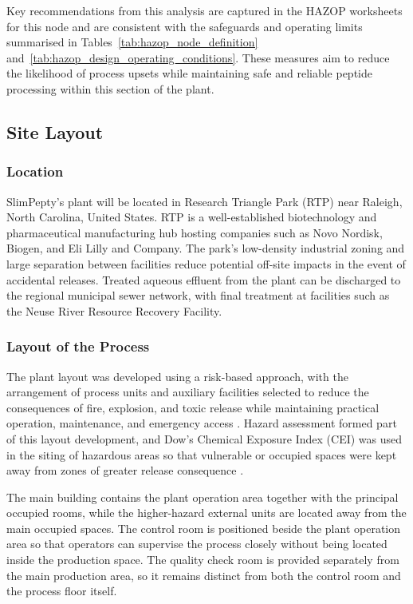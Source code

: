Key recommendations from this analysis are captured in the HAZOP worksheets for this node and are consistent with the safeguards and operating limits summarised in Tables~\ref{tab:hazop_node_definition} and~\ref{tab:hazop_design_operating_conditions}. These measures aim to reduce the likelihood of process upsets while maintaining safe and reliable peptide processing within this section of the plant.

\subsection{Site Layout}

\subsubsection{Location}

SlimPepty's plant will be located in Research Triangle Park (RTP) near Raleigh, North Carolina, United States. RTP is a well-established biotechnology and pharmaceutical manufacturing hub hosting companies such as Novo Nordisk, Biogen, and Eli Lilly and Company. The park's low-density industrial zoning and large separation between facilities reduce potential off-site impacts in the event of accidental releases. Treated aqueous effluent from the plant can be discharged to the regional municipal sewer network, with final treatment at facilities such as the Neuse River Resource Recovery Facility.

\subsubsection{Layout of the Process}

The plant layout was developed using a risk-based approach, with the arrangement of process units and auxiliary facilities selected to reduce the consequences of fire, explosion, and toxic release while maintaining practical operation, maintenance, and emergency access \cite{Lees_2012}. Hazard assessment formed part of this layout development, and Dow's Chemical Exposure Index (CEI) was used in the siting of hazardous areas so that vulnerable or occupied spaces were kept away from zones of greater release consequence \cite{AIChE_CEI_1998}.

The main building contains the plant operation area together with the principal occupied rooms, while the higher-hazard external units are located away from the main occupied spaces. The control room is positioned beside the plant operation area so that operators can supervise the process closely without being located inside the production space. The quality check room is provided separately from the main production area, so it remains distinct from both the control room and the process floor itself.

